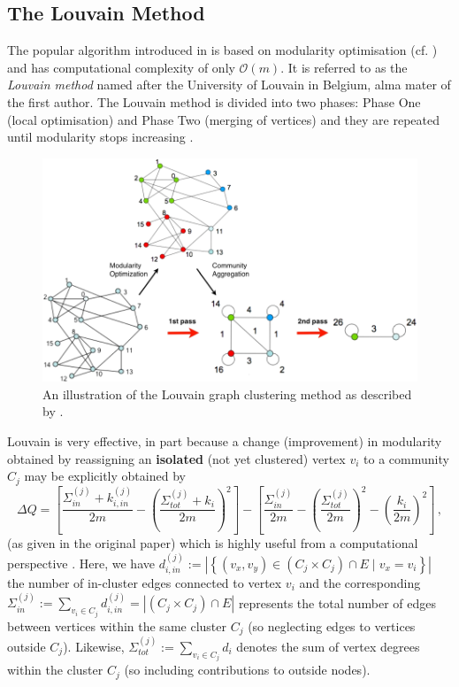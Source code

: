 \documentclass[12pt, a4paper]{article}
\begin{document}
  \subsection{The Louvain Method}
  \label{sec:louvain}
  The popular algorithm introduced in \cite{lambiotte-louvain-clustering} is based on modularity optimisation (cf. ) and has computational complexity of only $\mathcal{O}(m)$.
  It is referred to as the \textit{Louvain method} named after the University of Louvain in Belgium, alma mater of the first author.
  The Louvain method is divided into two phases: Phase One (local optimisation) and Phase Two (merging of vertices) and they are repeated until modularity stops increasing \parencite{lambiotte-louvain-clustering}.

  \begin{figure}[H]
    \centering
    \includegraphics[width=\linewidth]{figures/blondel.png}
    \caption{An illustration of the Louvain graph clustering method as described by \cite{lambiotte-louvain-clustering}.}
  \end{figure}

  Louvain is very effective, in part because a change (improvement) in modularity obtained by reassigning an \textbf{isolated} (not yet clustered) vertex $v_i$ to a community $C_j$ may be explicitly obtained by
  \begin{equation}
    \Delta Q=\left[ \frac{\Sigma_{in}^{(j)} + k_{i,in}^{(j)}}{2 m} - \left(\frac{\Sigma_{tot}^{(j)} + k_{i}}{2m}\right)^2 \right] - \left[ \frac{\Sigma_{in}^{(j)}}{2m} - \left(\frac{\Sigma_{tot}^{(j)}}{2m}\right)^2 - \left(\frac{k_i}{2m}\right)^2 \right] \,,
    \label{eq:blondel-deltaQ}
  \end{equation}
  (as given in the original paper) which is highly useful from a computational perspective \parencite{lambiotte-louvain-clustering}.
  Here, we have $d_{i,in}^{(j)} := \left|\left\{(v_x, v_y) \in (C_j \times C_j) \cap E \;\big|\; v_x = v_i\right\}\right|$ the number of in-cluster edges connected to vertex $v_i$ and the corresponding $\Sigma_{in}^{(j)} := \sum_{v_i \in C_j} d_{i,in}^{(j)} = \left|(C_j \times C_j) \cap E\right|$ represents the total number of edges between vertices within the same cluster $C_j$ (so neglecting edges to vertices outside $C_j$).
  Likewise, $\Sigma_{tot}^{(j)} := \sum_{v_i \in C_j} d_i$ denotes the sum of vertex degrees within the cluster $C_j$ (so including contributions to outside nodes).
\end{document}
